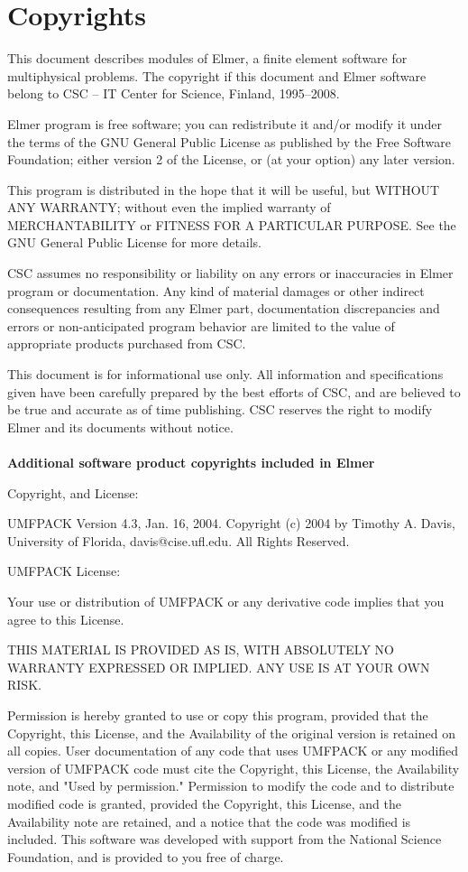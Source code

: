 \chapter*{Copyrights}

This document describes modules of Elmer,
a finite element software for multiphysical problems.
The copyright if this document and Elmer software belong to
CSC -- IT Center for Science, Finland, 1995--2008. 

Elmer program is free software; you can redistribute it and/or
modify it under the terms of the GNU General Public License
as published by the Free Software Foundation; either version 2
of the License, or (at your option) any later version.

This program is distributed in the hope that it will be useful,
but WITHOUT ANY WARRANTY; without even the implied warranty of
MERCHANTABILITY or FITNESS FOR A PARTICULAR PURPOSE.  See the
GNU General Public License for more details.

CSC assumes no responsibility or liability on any errors or inaccuracies in 
Elmer program or documentation. Any kind of material damages or other indirect
consequences resulting from any Elmer part, documentation discrepancies and 
errors or non-anticipated program behavior are limited to the value of 
appropriate products purchased from CSC. 

This document is for informational use only. All information and specifications
given have been carefully prepared by the best efforts of CSC, and are believed
to be true and accurate as of time publishing. CSC reserves the right to 
modify Elmer and its documents without notice. \\  \mbox{} \\

\textbf{Additional software product copyrights included in Elmer}

Copyright, and License:

UMFPACK Version 4.3, Jan. 16, 2004. Copyright (c) 2004 by Timothy
A. Davis, University of Florida, davis@cise.ufl.edu. All Rights
Reserved. 


UMFPACK License: 

Your use or distribution of UMFPACK or any derivative code implies
that you agree to this License. 

      THIS MATERIAL IS PROVIDED AS IS, WITH ABSOLUTELY NO WARRANTY
      EXPRESSED OR IMPLIED. ANY USE IS AT YOUR OWN RISK. 

      Permission is hereby granted to use or copy this program,
      provided that the Copyright, this License, and the Availability
      of the original version is retained on all copies. User
      documentation of any code that uses UMFPACK or any modified
      version of UMFPACK code must cite the Copyright, this License,
      the Availability note, and "Used by permission." Permission to
      modify the code and to distribute modified code is granted,
      provided the Copyright, this License, and the Availability note
      are retained, and a notice that the code was modified is
      included. This software was developed with support from the
      National Science Foundation, and is provided to you free of
      charge. 

